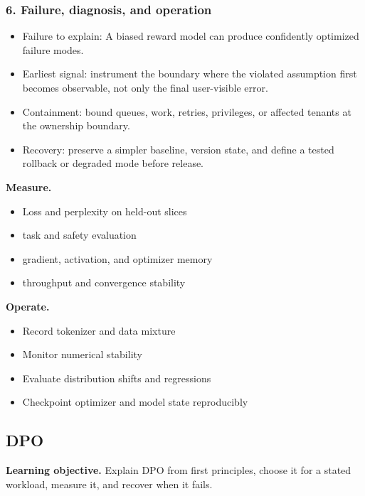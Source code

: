 \subsubsection*{6. Failure, diagnosis, and operation}
\begin{itemize}
\item Failure to explain: A biased reward model can produce confidently optimized failure modes.
\item Earliest signal: instrument the boundary where the violated assumption first becomes observable, not only the final user-visible error.
\item Containment: bound queues, work, retries, privileges, or affected tenants at the ownership boundary.
\item Recovery: preserve a simpler baseline, version state, and define a tested rollback or degraded mode before release.
\end{itemize}
\textbf{Measure.}\begin{itemize}
\item Loss and perplexity on held-out slices
\item task and safety evaluation
\item gradient, activation, and optimizer memory
\item throughput and convergence stability
\end{itemize}
\textbf{Operate.}\begin{itemize}
\item Record tokenizer and data mixture
\item Monitor numerical stability
\item Evaluate distribution shifts and regressions
\item Checkpoint optimizer and model state reproducibly
\end{itemize}
\subsection{DPO}
\textbf{Learning objective.} Explain DPO from first principles, choose it for a stated workload, measure it, and recover when it fails.
